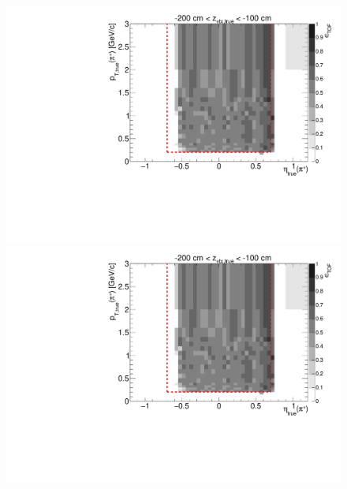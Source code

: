 \begin{figure}[hb]
{  \includegraphics[width=\linewidth,page=16]{graphics/eff/Eff2D_TOF_pion_Plus.pdf}\\
  \includegraphics[width=\linewidth,page=18]{graphics/eff/Eff2D_TOF_pion_Plus.pdf}
}%
\end{figure}





